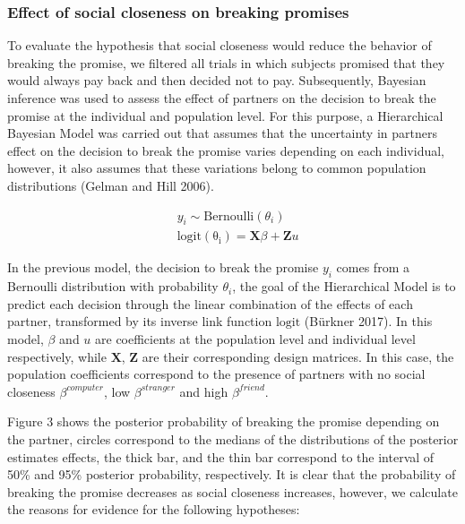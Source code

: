 \documentclass[smallextended]{svjour3}       %
\begin{document}
\hypertarget{effect-of-social-closeness-on-breaking-promises}{%
\subsubsection{Effect of social closeness on breaking
promises}\label{effect-of-social-closeness-on-breaking-promises}}

To evaluate the hypothesis that social closeness would reduce the
behavior of breaking the promise, we filtered all trials in which
subjects promised that they would always pay back and then decided not
to pay. Subsequently, Bayesian inference was used to assess the effect
of partners on the decision to break the promise at the individual and
population level. For this purpose, a Hierarchical Bayesian Model was
carried out that assumes that the uncertainty in partners effect on the
decision to break the promise varies depending on each individual,
however, it also assumes that these variations belong to common
population distributions (Gelman and Hill 2006).

\[
\begin{aligned}
&y_i \sim \mathrm{Bernoulli}(\theta_i) \\
&\mathrm{logit(\theta_i)} = \mathbf{X}\beta  +  \mathbf{Z}u
\end{aligned}
\]

In the previous model, the decision to break the promise \(y_i\) comes
from a Bernoulli distribution with probability \(\theta_i\), the goal of
the Hierarchical Model is to predict each decision through the linear
combination of the effects of each partner, transformed by its inverse
link function \(\mathrm{logit}\) (Bürkner 2017). In this model,
\(\beta\) and \(u\) are coefficients at the population level and
individual level respectively, while \(\mathbf{X}\), \(\mathbf{Z}\) are
their corresponding design matrices. In this case, the population
coefficients correspond to the presence of partners with no social
closeness \(\beta^{computer}\), low \(\beta^{stranger}\) and high
\(\beta^{friend}\).

Figure 3 shows the posterior probability of breaking the promise
depending on the partner, circles correspond to the medians of the
distributions of the posterior estimates effects, the thick bar, and the
thin bar correspond to the interval of 50\% and 95\% posterior
probability, respectively. It is clear that the probability of breaking
the promise decreases as social closeness increases, however, we
calculate the reasons for evidence for the following hypotheses:
\end{document}
